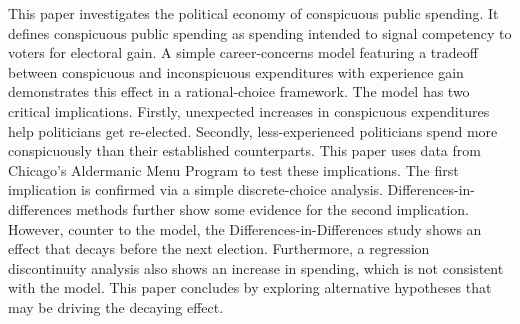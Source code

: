 \begin{spacing}{1.0}
This paper investigates the political economy of conspicuous public spending. 
It defines conspicuous public spending as spending intended to signal competency to voters for electoral gain. 
A simple career-concerns model featuring a tradeoff between conspicuous and inconspicuous expenditures with experience gain demonstrates this effect in a rational-choice framework. 
The model has two critical implications. 
Firstly, unexpected increases in conspicuous expenditures help politicians get re-elected. 
Secondly, less-experienced politicians spend more conspicuously than their established counterparts. 
This paper uses data from Chicago's Aldermanic Menu Program to test these implications. 
The first implication is confirmed via a simple discrete-choice analysis. Differences-in-differences methods further show some evidence for the second implication. 
However, counter to the model, the Differences-in-Differences study shows an effect that decays before the next election.
Furthermore, a regression discontinuity analysis also shows an increase in spending, which is not consistent with the model.
This paper concludes by exploring alternative hypotheses that may be driving the decaying effect.
\end{spacing}